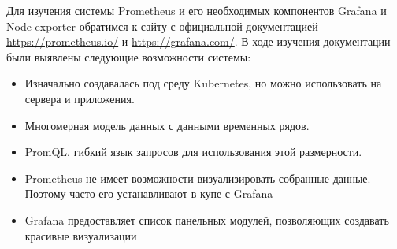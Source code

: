Для изучения системы Prometheus и его необходимых компонентов Grafana и Node exporter обратимся к сайту с официальной документацией 
\href{https://prometheus.io/}{https://prometheus.io/} и \href{https://grafana.com/}{https://grafana.com/}.
В ходе изучения документации были выявлены следующие возможности системы:
\begin{itemize}
    \item Изначально создавалась под среду Kubernetes, но можно использовать на сервера и приложения.
    \item Многомерная модель данных с данными временных рядов.
    \item PromQL, гибкий язык запросов для использования этой размерности.
    \item Prometheus не имеет возможности визуализировать собранные данные. Поэтому часто его устанавливают в купе с Grafana
    \item Grafana предоставляет список панельных модулей, позволяющих создавать красивые визуализации
\end{itemize}






